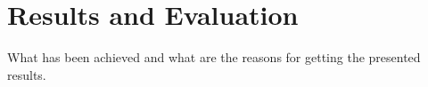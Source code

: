 \chapter{Results and Evaluation}
\label{sec:results_and_evaluation}

What has been achieved and what are the reasons for getting the presented results.
